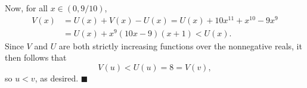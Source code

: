\begin{enumerate}
 Now, for all $x \in (0,9/10)$,
 \begin{align*} V(x) &= U(x) + V(x)-U(x) = U(x) + 10x^{11}+x^{10} -9x^9 \\ &= U(x) + x^9 (10x -9) (x+1) < U(x) . \end{align*}
Since $V$ and $U$ are both strictly increasing functions over the nonnegative reals, it then follows that
 \[V(u) < U(u) = 8 = V(v),\]so $u<v$, as desired.  $\blacksquare$



\end{enumerate}